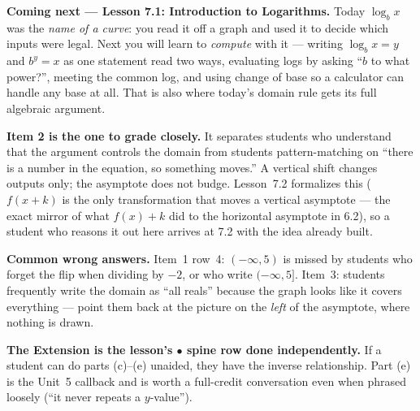 \documentclass[10pt]{article}
\begin{document}
\begin{spiralbox}
\textbf{Coming next --- Lesson 7.1: Introduction to Logarithms.} Today $\log_b x$ was the
\emph{name of a curve}: you read it off a graph and used it to decide which inputs were legal. Next
you will learn to \emph{compute} with it --- writing $\log_b x = y$ and $b^y = x$ as one statement
read two ways, evaluating logs by asking ``$b$ to what power?'', meeting the common log, and using
change of base so a calculator can handle any base at all. That is also where today's domain rule
gets its full algebraic argument.
\end{spiralbox}

\begin{teachernote}
\textbf{Item 2 is the one to grade closely.} It separates students who understand that the argument
controls the domain from students pattern-matching on ``there is a number in the equation, so
something moves.'' A vertical shift changes outputs only; the asymptote does not budge. Lesson~7.2
formalizes this ($f(x+k)$ is the only transformation that moves a vertical asymptote --- the exact
mirror of what $f(x)+k$ did to the horizontal asymptote in 6.2), so a student who reasons it out here
arrives at 7.2 with the idea already built.

\textbf{Common wrong answers.} Item~1 row~4: $(-\infty,5)$ is missed by students who forget the flip
when dividing by $-2$, or who write $(-\infty,5]$. Item~3: students frequently write the domain as
``all reals'' because the graph looks like it covers everything --- point them back at the picture on
the \emph{left} of the asymptote, where nothing is drawn.

\textbf{The Extension is the lesson's $\bullet$ spine row done independently.} If a student can do
parts (c)--(e) unaided, they have the inverse relationship. Part (e) is the Unit~5 callback and is
worth a full-credit conversation even when phrased loosely (``it never repeats a $y$-value'').
\end{teachernote}
\end{document}
